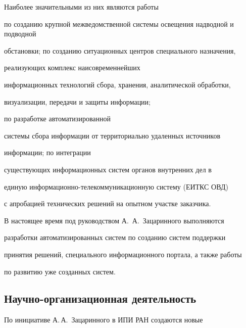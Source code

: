 Наиболее значительными из них являются работы


по созданию крупной межведомственной сис\-те\-мы освещения надводной и подводной 


обстановки; по созданию ситуационных центров специального назначения,


реализующих комплекс наисовременнейших 


информационных технологий сбора, хранения, аналитической обработки, 


визуализации, передачи и защиты информации;


по разработке автоматизированной 


сис\-те\-мы сбора информации от территориально удаленных источников 


информации; по интеграции 


существующих информационных сис\-тем органов внутренних дел в 


единую информационно-те\-ле\-ком\-му\-ни\-ка\-ци\-он\-ную сис\-те\-му (ЕИТКС ОВД) 


с апробацией технических решений на опытном участке заказчика. 








В настоящее время под руководством А.~А.~Зацаринного выполняются 


разработки автоматизированных сис\-тем по созданию сис\-тем поддержки 


принятия решений, специального информационного портала, а также работы 


по развитию уже созданных систем.





\vspace*{-6pt}


     


     \subsection*{Научно-организационная деятельность}


     


     \vspace*{-3pt}


     


По инициативе А.\,А.~Зацаринного в ИПИ РАН создаются новые 


